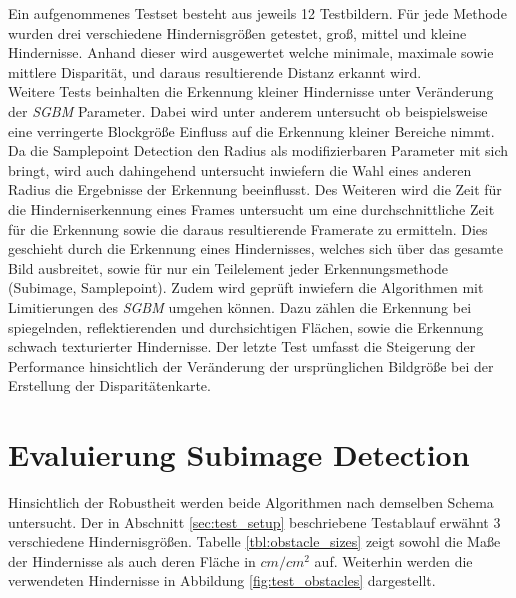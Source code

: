 \noindent
Ein aufgenommenes Testset besteht aus jeweils 12 Testbildern. Für jede Methode wurden drei verschiedene Hindernisgrößen getestet, groß, mittel und kleine Hindernisse. Anhand dieser wird ausgewertet welche minimale, maximale sowie mittlere Disparität, und daraus resultierende Distanz erkannt wird.\\

\noindent
Weitere Tests beinhalten die Erkennung kleiner Hindernisse unter Veränderung der \emph{SGBM} Parameter. Dabei wird unter anderem untersucht ob beispielsweise eine verringerte Blockgröße Einfluss auf die Erkennung kleiner Bereiche nimmt. Da die Samplepoint Detection den Radius als modifizierbaren Parameter mit sich bringt, wird auch dahingehend untersucht inwiefern die Wahl eines anderen Radius die Ergebnisse der Erkennung beeinflusst. Des Weiteren wird die Zeit für die Hinderniserkennung eines Frames untersucht um eine durchschnittliche Zeit für die Erkennung sowie die daraus resultierende Framerate zu ermitteln. Dies geschieht durch die Erkennung eines Hindernisses, welches sich über das gesamte Bild ausbreitet, sowie für nur ein Teilelement jeder Erkennungsmethode (Subimage, Samplepoint). Zudem wird geprüft inwiefern die Algorithmen mit Limitierungen des \emph{SGBM} umgehen können. Dazu zählen die Erkennung bei spiegelnden, reflektierenden und durchsichtigen Flächen, sowie die Erkennung schwach texturierter Hindernisse. Der letzte Test umfasst die Steigerung der Performance hinsichtlich der Veränderung der ursprünglichen Bildgröße bei der Erstellung der Disparitätenkarte.\\



\section{Evaluierung Subimage Detection}
\label{sec:evaluierung_subimage}

Hinsichtlich der Robustheit werden beide Algorithmen nach demselben Schema untersucht. Der in Abschnitt \ref{sec:test_setup} beschriebene Testablauf erwähnt 3 verschiedene Hindernisgrößen. Tabelle \ref{tbl:obstacle_sizes} zeigt sowohl die Maße der Hindernisse als auch deren Fläche in $cm/cm^2$ auf. Weiterhin werden die verwendeten Hindernisse in Abbildung \ref{fig:test_obstacles} dargestellt.

